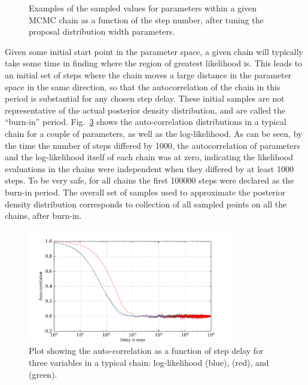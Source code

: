 \begin{figure}
\begin{subfigure}{0.98\textwidth}
        \caption{\tonetwo{}}
        \label{fig:theta_12_vs_step}
    \end{subfigure}
    \caption[Examples of the sampled values for parameters within a given MCMC chain as a function of the step number]
    {Examples of the sampled values for parameters within a given MCMC chain as a function of the step number, after tuning the proposal distribution width parameters.}
    \label{fig:params_vs_step_plots}
\end{figure}

Given some initial start point in the parameter space, a given chain will typically take some time in finding where the region of greatest likelihood is. This leads to an initial set of steps where the chain moves a large distance in the parameter space in the same direction, so that the autocorrelation of the chain in this period is substantial for any chosen step delay. These initial samples are not representative of the actual posterior density distribution, and are called the ``burn-in'' period. Fig.~\ref{fig:auto_corr} shows the auto-correlation distributions in a typical chain for a couple of parameters, as well as the log-likelihood. As can be seen, by the time the number of steps differed by \num{1000}, the autocorrelation of parameters and the log-likelihood itself of each chain was at zero, indicating the likelihood evaluations in the chains were independent when they differed by at least \num{1000} steps. To be very safe, for all chains the first \num{100000} steps were declared as the burn-in period. The overall set of samples used to approximate the posterior density distribution corresponds to collection of all sampled points on all the chains, after burn-in.


\begin{figure}
    \centering
    \includegraphics[width=0.8\textwidth]{6_SolarAnalysis/images/autocorr_plot_llh_dmsq_theta12.pdf}
    \caption[Plot showing the auto-correlation as a function of step delay for three variables in a typical chain]
    {Plot showing the auto-correlation as a function of step delay for three variables in a typical chain: log-likelihood (blue), \dmsq{} (red), and \tonetwo{} (green).}
    \label{fig:auto_corr}
\end{figure}


